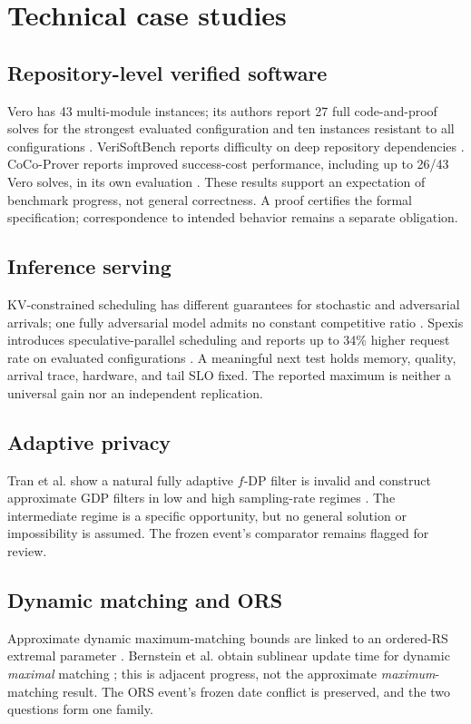 \documentclass[11pt]{article}
\begin{document}
\section{Technical case studies}
\subsection{Repository-level verified software}
Vero has 43 multi-module instances; its authors report 27 full code-and-proof solves for the strongest evaluated configuration and ten instances resistant to all configurations \citep{ye2026vero}. VeriSoftBench reports difficulty on deep repository dependencies \citep{xin2026verisoft}. CoCo-Prover reports improved success-cost performance, including up to 26/43 Vero solves, in its own evaluation \citep{yao2026cocoprover}. These results support an expectation of benchmark progress, not general correctness. A proof certifies the formal specification; correspondence to intended behavior remains a separate obligation.

\subsection{Inference serving}
KV-constrained scheduling has different guarantees for stochastic and adversarial arrivals; one fully adversarial model admits no constant competitive ratio \citep{jaillet2025kv}. Spexis introduces speculative-parallel scheduling and reports up to 34\% higher request rate on evaluated configurations \citep{jung2026spexis}. A meaningful next test holds memory, quality, arrival trace, hardware, and tail SLO fixed. The reported maximum is neither a universal gain nor an independent replication.

\subsection{Adaptive privacy}
Tran et al. show a natural fully adaptive $f$-DP filter is invalid and construct approximate GDP filters in low and high sampling-rate regimes \citep{tran2026fdp}. The intermediate regime is a specific opportunity, but no general solution or impossibility is assumed. The frozen event's comparator remains flagged for review.

\subsection{Dynamic matching and ORS}
Approximate dynamic maximum-matching bounds are linked to an ordered-RS extremal parameter \citep{assadi2025ors}. Bernstein et al. obtain sublinear update time for dynamic \emph{maximal} matching \citep{bernstein2025maximal}; this is adjacent progress, not the approximate \emph{maximum}-matching result. The ORS event's frozen date conflict is preserved, and the two questions form one family.
\end{document}
